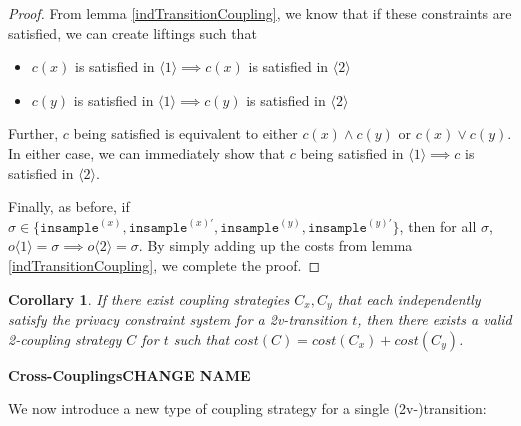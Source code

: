 \documentclass[12pt]{article}
\newcommand{\brangle}[1]{\langle#1 \rangle}
\newtheorem{cor}[thm]{Corollary}
\theoremstyle{definition}
\begin{document}
\begin{proof}
    From lemma \ref{indTransitionCoupling}, we know that if these constraints are satisfied, we can create liftings such that \begin{itemize}
        \item $c(x)$ is satisfied in $\brangle{1}\implies c(x)$ is satisfied in $\brangle{2}$
        \item $c(y)$ is satisfied in $\brangle{1}\implies c(y)$ is satisfied in $\brangle{2}$
    \end{itemize}
    Further, $c$ being satisfied is equivalent to either $c(x)\land c(y)$ or $c(x)\lor c(y)$. In either case, we can immediately show that $c$ being satisfied in $\brangle{1}\implies c$ is satisfied in $\brangle{2}$.

    Finally, as before, if $\sigma \in \{\texttt{insample}^{(x)}, \texttt{insample}^{(x)\prime}, \texttt{insample}^{(y)},\texttt{insample}^{(y)\prime}\}$, then for all $\sigma$, $o\brangle{1}=\sigma \implies o\brangle{2} = \sigma$. By simply adding up the costs from lemma \ref{indTransitionCoupling}, we complete the proof.
\end{proof}


\begin{cor}
    If there exist coupling strategies $C_x, C_y$ that each independently satisfy the privacy constraint system for a 2v-transition $t$, then there exists a valid 2-coupling strategy $C$ for $t$ such that $cost(C) = cost(C_x)+cost(C_y)$. 
\end{cor}

\textbf{Cross-Couplings{\color{red}CHANGE NAME}}

We now introduce a new type of coupling strategy for a single (2v-)transition:
\end{document}
